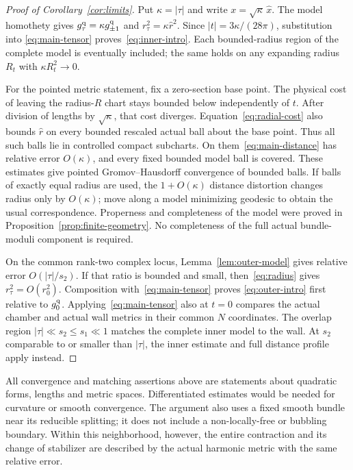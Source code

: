 \begin{proof}[Proof of Corollary~\ref{cor:limits}]
Put $\kappa=|\tau|$ and write $x=\sqrt\kappa\,\widehat x$.
The model homothety gives
$g_\tau^{\rm q}=\kappa g_{\pm1}^{\rm q}$ and
$r_\tau^2=\kappa\widehat r^2$. Since
$|t|=3\kappa/(28\pi)$, substitution into
\eqref{eq:main-tensor} proves~\eqref{eq:inner-intro}.
Each bounded-radius region of the complete model is eventually
included; the same holds on any expanding radius $R_t$ with
$\kappa R_t^2\to0$.

For the pointed metric statement, fix a zero-section base point.
The physical cost of leaving the radius-$R$ chart stays bounded
below independently of $t$. After division of lengths by
$\sqrt\kappa$, that cost diverges. Equation~\eqref{eq:radial-cost}
also bounds $\widehat r$ on every bounded rescaled actual ball
about the base point. Thus all such balls lie in controlled
compact subcharts. On them~\eqref{eq:main-distance} has relative
error $O(\kappa)$, and every fixed bounded model ball is covered.
These estimates give pointed Gromov--Hausdorff convergence of
bounded balls. If balls of exactly equal radius are used, the
$1+O(\kappa)$ distance distortion changes radius only by
$O(\kappa)$; move along a model minimizing geodesic to obtain
the usual correspondence. Properness and completeness of the
model were proved in Proposition~\ref{prop:finite-geometry}.
No completeness of the full actual bundle-moduli component
is required.

On the common rank-two complex locus, Lemma~\ref{lem:outer-model}
gives relative error $O(|\tau|/s_2)$. If that ratio is bounded
and small, then~\eqref{eq:radius} gives $r_\tau^2=O(r_0^2)$.
Composition with~\eqref{eq:main-tensor} proves
\eqref{eq:outer-intro} first relative to $g_0^{\rm q}$.
Applying~\eqref{eq:main-tensor} also at $t=0$ compares the
actual chamber and actual wall metrics in their common $N$
coordinates. The overlap region
$|\tau|\ll s_2\le s_1\ll1$ matches the complete inner model
to the wall. At $s_2$ comparable to or smaller than $|\tau|$,
the inner estimate and full distance profile apply instead.
\end{proof}

All convergence and matching assertions above are statements about
quadratic forms, lengths and metric spaces. Differentiated estimates
would be needed for curvature or smooth convergence. The argument
also uses a fixed smooth bundle near its reducible splitting; it
does not include a non-locally-free or bubbling boundary. Within
this neighborhood, however, the entire contraction and its change
of stabilizer are described by the actual harmonic metric with
the same relative error.
